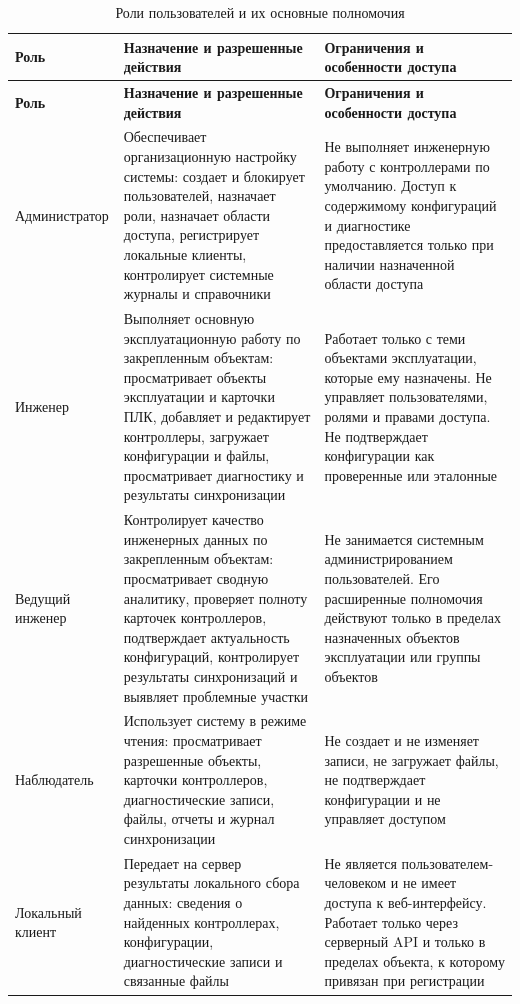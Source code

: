 \small
\begin{longtable}{|p{}|p{}|p{}|}
    \caption{Роли пользователей и их основные полномочия} \label{tab:roles_permissions} \\
    \hline
    \textbf{Роль} & \textbf{Назначение и разрешенные действия} & \textbf{Ограничения и особенности доступа} \\ \hline
    \endfirsthead
    \tabcont{\ref{tab:roles_permissions}}
    \textbf{Роль} & \textbf{Назначение и разрешенные действия} & \textbf{Ограничения и особенности доступа} \\ \hline
    \endhead
    \hline
    \endfoot
    \hline
    \endlastfoot

    Администратор & Обеспечивает организационную настройку системы: создает и блокирует пользователей, назначает роли, назначает области доступа, регистрирует локальные клиенты, контролирует системные журналы и справочники & Не выполняет инженерную работу с контроллерами по умолчанию. Доступ к содержимому конфигураций и диагностике предоставляется только при наличии назначенной области доступа \\ \hline

    Инженер & Выполняет основную эксплуатационную работу по закрепленным объектам: просматривает объекты эксплуатации и карточки ПЛК, добавляет и редактирует контроллеры, загружает конфигурации и файлы, просматривает диагностику и результаты синхронизации & Работает только с теми объектами эксплуатации, которые ему назначены. Не управляет пользователями, ролями и правами доступа. Не подтверждает конфигурации как проверенные или эталонные \\ \hline

    Ведущий инженер & Контролирует качество инженерных данных по закрепленным объектам: просматривает сводную аналитику, проверяет полноту карточек контроллеров, подтверждает актуальность конфигураций, контролирует результаты синхронизаций и выявляет проблемные участки & Не занимается системным администрированием пользователей. Его расширенные полномочия действуют только в пределах назначенных объектов эксплуатации или группы объектов \\ \hline

    Наблюдатель & Использует систему в режиме чтения: просматривает разрешенные объекты, карточки контроллеров, диагностические записи, файлы, отчеты и журнал синхронизации & Не создает и не изменяет записи, не загружает файлы, не подтверждает конфигурации и не управляет доступом \\ \hline

    Локальный клиент & Передает на сервер результаты локального сбора данных: сведения о найденных контроллерах, конфигурации, диагностические записи и связанные файлы & Не является пользователем-человеком и не имеет доступа к веб-интерфейсу. Работает только через серверный API и только в пределах объекта, к которому привязан при регистрации \\ \hline
\end{longtable}
\normalsize


